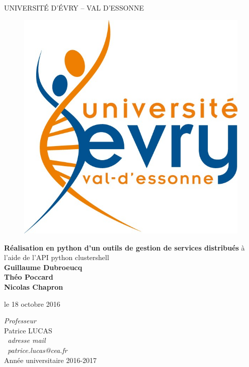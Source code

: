 \documentclass[a4paper,11pt]{article}
\begin{document}
\renewcommand{\refname}{Bibliographie}



\thispagestyle{empty}
\begin{center}
	 {\LARGE UNIVERSITÉ D'ÉVRY -- VAL D'ESSONNE}
	 
\vskip 10mm	 
	 \begin{figure}[H]
		\centerline{\includegraphics[scale=0.4]{logoUEVE.png}}

	\end{figure}

  \vfill {\huge {\bf Réalisation en python d'un outils de gestion de services distribués}} 
  \vskip 1mm
 à l'aide de l'API python clustershell\\
  
  \vskip 3mm {\LARGE {\bf Guillaume Dubroeucq}} 
  \\ \LARGE {\bf Théo Poccard}
  \\ \LARGE {\bf Nicolas Chapron}
  
  \vskip 3mm le 18 octobre 2016
  \vfill
 
  \emph{Professeur}\\
  Patrice LUCAS\\
  \emph{\ adresse mail}\\
	\emph{\ patrice.lucas@cea.fr}\\
  \vskip 3cm Année universitaire 2016-2017
\end{center}
\end{document}
